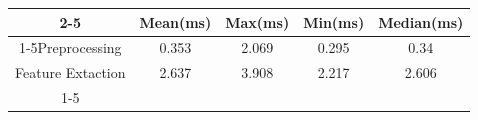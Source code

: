\documentclass{standalone}
\begin{document}
 
 \begin{tabular}{|c |c |c |c |c |}
\cline{2-5}\cline{2-5} \multicolumn{1}{c |}{ } & Mean(ms) & Max(ms) & Min(ms) & Median(ms)\\ 
\cline{1-5}Preprocessing & 0.353 & 2.069 & 0.295 & 0.34\\ 
 \hhline{|=|=|=|=|=|}Feature Extaction & 2.637 & 3.908 & 2.217 & 2.606\\ 
 \cline{1-5}\hline \end{tabular}
 
\end{document}
